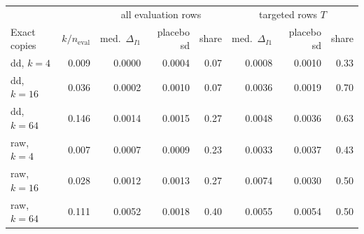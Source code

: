 \begin{tabular}{lrrrrrrr}\toprule
 & & \multicolumn{3}{c}{all evaluation rows} & \multicolumn{3}{c}{targeted rows $T$}\\
Exact copies & $k/n_{\mathrm{eval}}$ & med.\ $\Delta_{I1}$ & placebo sd & share & med.\ $\Delta_{I1}$ & placebo sd & share\\\midrule
dd, $k=4$ & 0.009 & 0.0000 & 0.0004 & 0.07 & 0.0008 & 0.0010 & 0.33\\
dd, $k=16$ & 0.036 & 0.0002 & 0.0010 & 0.07 & 0.0036 & 0.0019 & 0.70\\
dd, $k=64$ & 0.146 & 0.0014 & 0.0015 & 0.27 & 0.0048 & 0.0036 & 0.63\\
raw, $k=4$ & 0.007 & 0.0007 & 0.0009 & 0.23 & 0.0033 & 0.0037 & 0.43\\
raw, $k=16$ & 0.028 & 0.0012 & 0.0013 & 0.27 & 0.0074 & 0.0030 & 0.50\\
raw, $k=64$ & 0.111 & 0.0052 & 0.0018 & 0.40 & 0.0055 & 0.0054 & 0.50\\
\bottomrule\end{tabular}
